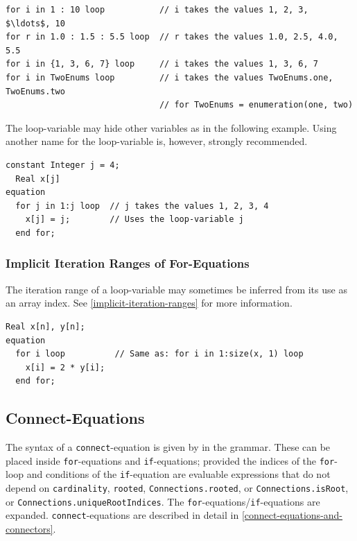 \begin{example}
\begin{lstlisting}[language=modelica]
for i in 1 : 10 loop           // i takes the values 1, 2, 3, $\ldots$, 10
for r in 1.0 : 1.5 : 5.5 loop  // r takes the values 1.0, 2.5, 4.0, 5.5
for i in {1, 3, 6, 7} loop     // i takes the values 1, 3, 6, 7
for i in TwoEnums loop         // i takes the values TwoEnums.one, TwoEnums.two
                               // for TwoEnums = enumeration(one, two)
\end{lstlisting}

The loop-variable may hide other variables as in the following example.
Using another name for the loop-variable is, however, strongly recommended.
\begin{lstlisting}[language=modelica]
  constant Integer j = 4;
  Real x[j]
equation
  for j in 1:j loop  // j takes the values 1, 2, 3, 4
    x[j] = j;        // Uses the loop-variable j
  end for;
\end{lstlisting}
\end{example}


\subsubsection{Implicit Iteration Ranges of For-Equations}\label{implicit-iteration-ranges-of-for-equations}

The iteration range of a loop-variable may sometimes be inferred from its use as an array index.
See \cref{implicit-iteration-ranges} for more information.

\begin{example}
\begin{lstlisting}[language=modelica]
  Real x[n], y[n];
equation
  for i loop          // Same as: for i in 1:size(x, 1) loop
    x[i] = 2 * y[i];
  end for;
\end{lstlisting}
\end{example}


\subsection{Connect-Equations}\label{connect-equations}

The syntax of a \lstinline!connect!-equation is given by  in the grammar.
These can be placed inside \lstinline!for!-equations and \lstinline!if!-equations; provided the indices of the \lstinline!for!-loop and conditions of the \lstinline!if!-equation are evaluable expressions that do not depend on \lstinline!cardinality!, \lstinline!rooted!, \lstinline!Connections.rooted!, or \lstinline!Connections.isRoot!, or \lstinline!Connections.uniqueRootIndices!.
The \lstinline!for!-equations/\lstinline!if!-equations are expanded.
\lstinline!connect!-equations are described in detail in \cref{connect-equations-and-connectors}.

